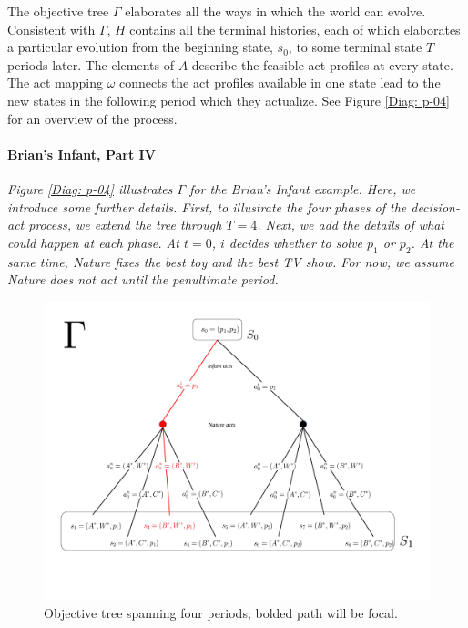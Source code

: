 \documentclass[
11pt,
titlepage,
reqno,
]{article}%
\theoremstyle{definition}
\begin{document}
The objective tree $\Gamma$ elaborates all the ways in which the world can evolve.
Consistent with $\Gamma$, $H$ contains all the terminal histories, each of which elaborates a particular evolution from the beginning state, $s_0$, to some terminal state $T$ periods later.
The elements of $A$ describe the feasible act profiles at every state.
The act mapping $\omega$ connects the act profiles available in one state lead to the new states in the following period which they actualize.
See Figure \ref{Diag: p-04} for an overview of the process.



\paragraph{Brian's Infant, Part IV}
{\em
Figure \ref{Diag: p-04} illustrates $\Gamma$ for the Brian's Infant example. 
Here, we introduce some further details.
First, to illustrate the four phases of the decision-act process, we extend the tree through $T=4$.
Next, we add the details of what could happen at each phase.
At $t=0$, $i$ decides whether to solve $p_1$ or $p_2$.
At the same time, Nature fixes the best toy and the best TV show. 
For now, we assume Nature does not act until the penultimate period.

\begin{figure}[h!]
	\centering
	\includegraphics*[page=5,trim = 0in 0in 0in 0in,scale=.65]{Awareness_Diagrams_All}
	\caption{Objective tree spanning four periods; bolded path will be focal.\label{Diag: p-05}}%
\end{figure}

}
\end{document}
